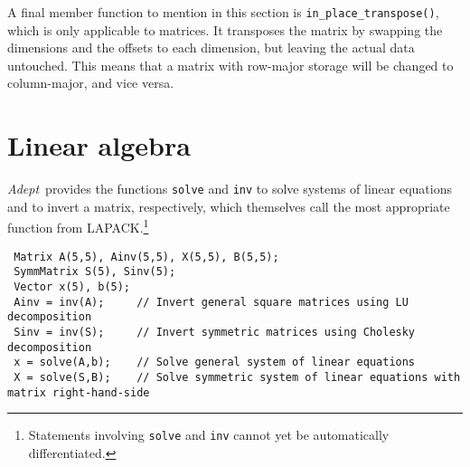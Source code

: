 \documentclass[a4,oneside]{book}
\def\codesize{\small}
\def\Adept{\emph{Adept}}
\def\code#1{{\codesize\texttt{#1}}}
\begin{document}
A final member function to mention in this section is
\code{in\_place\_transpose()}, which is only applicable to
matrices. It transposes the matrix by swapping the dimensions and the
offsets to each dimension, but leaving the actual data untouched.
This means that a matrix with row-major storage will be changed to
column-major, and vice versa.

\section{Linear algebra}
\label{sec:la}
\Adept\ provides the functions \code{solve} and \code{inv} to solve
systems of linear equations and to invert a matrix, respectively,
which themselves call the most appropriate function from
LAPACK.\footnote{Statements involving \code{solve} and \code{inv}
  cannot yet be automatically differentiated.}
\begin{lstlisting}
 Matrix A(5,5), Ainv(5,5), X(5,5), B(5,5);
 SymmMatrix S(5), Sinv(5);
 Vector x(5), b(5);
 Ainv = inv(A);     // Invert general square matrices using LU decomposition
 Sinv = inv(S);     // Invert symmetric matrices using Cholesky decomposition
 x = solve(A,b);    // Solve general system of linear equations
 X = solve(S,B);    // Solve symmetric system of linear equations with matrix right-hand-side
\end{lstlisting}
\iffalse
As for matrix multiplication described in section \ref{sec:matmul}, if
the arguments to \code{solve} and \code{inv} are not matrices with
fastest-varying dimensions that are contiguous and increasing, then
\Adept\ will first convert them to temporary matrices before
performing the operation.
\fi
\end{document}
